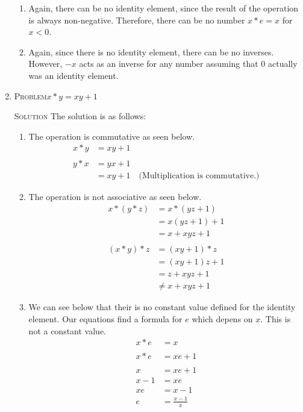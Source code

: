 \documentclass{amsart}
\newcommand{\Solution}{\textsc{Solution}\xspace}
\newcommand{\Problem}{\textsc{Problem}\xspace}
\begin{document}
\begin{enumerate}
\begin{enumerate}
      \item Again, there can be no identity element, since the result of
      the operation is always non-negative. Therefore, there can be 
      no number $x * e = x$ for $x < 0$.

      \item Again, since there is no identity element, there can be no inverses.
      However, $-x$ acts as an inverse for any number assuming that $0$ actually
      was an identity element.
   \end{enumerate}

   \item \Problem $x*y = xy + 1$

   \noindent \Solution The solution is as follows:

   \begin{enumerate}

      \item The operation is commutative as seen below.
      \begin{align*}
         x * y & = xy + 1  \\
	 \\
	 y * x & = yx + 1 \\
	       & = xy + 1 \quad\text{(Multiplication is commutative.)}
      \end{align*}

      \item The operation is not associative as seen below.
      \begin{align*}
         x * (y * z) & = x * (yz + 1) \\
	             & = x(yz + 1) + 1 \\
		     & = x + xyz + 1 \\
		     \\
	 (x * y) * z & = (xy + 1) * z \\
	             & = (xy + 1)z + 1 \\
		     & = z + xyz + 1 \\
		     & \ne x + xyz + 1
      \end{align*}

      \item We can see below that their is no constant value defined for
      the identity element. Our equations find a formula for $e$ which
      depens on $x$. This is not a constant value.
      \begin{align*}
         x * e & = x \\
	 \\
	 x * e & = xe + 1 \\
	 \\
	     x & = xe + 1 \\
	 x - 1 & = xe     \\
	 xe    & = x - 1  \\
	  e    & = \frac{x - 1}{x} \\
      \end{align*}


\end{enumerate}
\end{enumerate}
\end{document}
